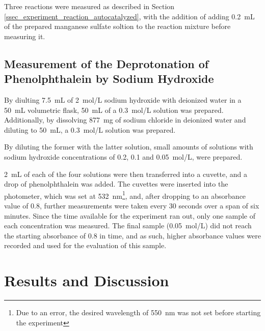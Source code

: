 \documentclass[titlepage]{article}
\begin{document}
Three reactions were measured as described in Section \ref{ssec_experiment_reaction_autocatalyzed}, with the addition of adding 0.2~mL of the prepared manganese sulfate soltion to the reaction mixture before measuring it.

\subsection{Measurement of the Deprotonation of Phenolphthalein by Sodium Hydroxide}
By diulting 7.5~mL of 2~mol/L sodium hydroxide with deionized water in a 50~mL volumetric flask, 50~mL of a 0.3~mol/L solution was prepared. Additionally, by dissolving 877~mg of sodium chloride in deionized water and diluting to 50~mL, a 0.3~mol/L solution was prepared.

By diluting the former with the latter solution, small amounts of solutions with sodium hydroxide concentrations of 0.2, 0.1 and 0.05~mol/L, were prepared.

2~mL of each of the four solutions were then transferred into a cuvette, and a drop of phenolphthalein was added. The cuvettes were inserted into the photometer, which was set at 532~nm\footnote{Due to an error, the desired wavelength of 550~nm was not set before starting the experiment}, and, after dropping to an absorbance value of 0.8, further measurements were taken every 30 seconds over a span of six minutes. Since the time available for the experiment ran out, only one sample of each concentration was measured. The final sample (0.05~mol/L) did not reach the starting absorbance of 0.8 in time, and as such, higher absorbance values were recorded and used for the evaluation of this sample.

\newpage
\section{Results and Discussion}
\end{document}
